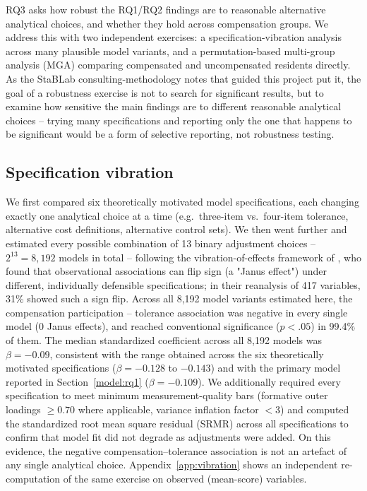 RQ3 asks how robust the RQ1/RQ2 findings are to reasonable alternative
analytical choices, and whether they hold across compensation groups. We
address this with two independent exercises: a specification-vibration
analysis across many plausible model variants, and a permutation-based
multi-group analysis (MGA) comparing compensated and uncompensated
residents directly. As the StaBLab consulting-methodology notes that guided
this project put it, the goal of a robustness exercise is not to search for
significant results, but to examine how sensitive the main findings are to
different reasonable analytical choices -- trying many specifications and
reporting only the one that happens to be significant would be a form of
selective reporting, not robustness testing.

\subsection{Specification vibration}
\label{robustness:vibration}

We first compared six theoretically motivated model specifications, each
changing exactly one analytical choice at a time (e.g.\ three-item vs.\
four-item tolerance, alternative cost definitions, alternative control sets).
We then went further and estimated every possible combination of 13 binary
adjustment choices -- $2^{13} = 8{,}192$ models in total -- following the
vibration-of-effects framework of \citet{Patel2015}, who found that
observational associations can flip sign (a "Janus effect") under different,
individually defensible specifications; in their reanalysis of 417
variables, 31\% showed such a sign flip. Across all 8{,}192 model variants
estimated here, the compensation participation -- tolerance association
was negative in every single model (0 Janus effects), and reached
conventional significance ($p < .05$) in 99.4\% of them. The median
standardized coefficient across all 8{,}192 models was $\beta = -0.09$,
consistent with the range obtained across the six theoretically motivated
specifications ($\beta = -0.128$ to $-0.143$) and with the primary model
reported in Section~\ref{model:rq1} ($\beta = -0.109$). We additionally
required every specification to meet minimum measurement-quality bars
(formative outer loadings $\geq 0.70$ where applicable, variance inflation
factor $< 3$) and computed the standardized root mean square residual
(SRMR) across all specifications to confirm that model fit did not degrade
as adjustments were added. On this evidence, the negative
compensation--tolerance association is not an artefact of any single
analytical choice. Appendix~\ref{app:vibration} shows an independent
re-computation of the same exercise on observed (mean-score) variables.

